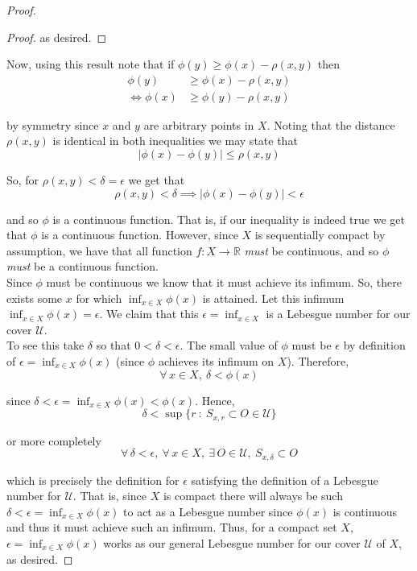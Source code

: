 \documentclass[12pt]{article}
\newlength\tindent
\renewcommand{\indent}{\hspace*{\tindent}}
\newcommand{\R}{\mathbb R}
\begin{document}
\begin{proof}
\begin{proof}
as desired.
\end{proof}

Now, using this result note that if $\phi(y) \geq \phi(x) - \rho(x,y)$ then
\begin{align*}
	\phi(y) &\geq \phi(x) - \rho(x,y) \\
\iff \phi(x) &\geq \phi(y) - \rho(x,y)
\end{align*}

by symmetry since $x$ and $y$ are arbitrary points in $X$. Noting that the distance $\rho(x,y)$ is identical in both inequalities we may state that
\begin{equation*}
	|\phi(x) - \phi(y)| \leq \rho(x,y)
\end{equation*}

So, for $\rho(x,y) < \delta = \epsilon$ we get that
\begin{equation*}
	\rho(x,y) < \delta \implies |\phi(x) - \phi(y)| < \epsilon
\end{equation*}

and so $\phi$ is a continuous function. That is, if our inequality is indeed true we get that $\phi$ is a continuous function. However, since $X$ is sequentially compact by assumption, we have that all function $f:X\to\R$ {\em must} be continuous, and so $\phi$ {\em must} be a continuous function. \\

\indent Since $\phi$ must be continuous we know that it must achieve its infimum. So, there exists some $x$ for which $\inf_{x\in X} \phi(x)$ is attained. Let this infimum $\inf_{x\in X} \phi(x)= \epsilon$. We claim that this $\epsilon = \inf_{x\in X}$ is a Lebesgue number for our cover $\mathcal U$. \\

\indent To see this take $\delta$ so that $0 < \delta < \epsilon$. The small value of $\phi$ must be $\epsilon$ by definition of $\epsilon = \inf_{x\in X} \phi(x)$ (since $\phi$ achieves its infimum on $X$). Therefore,
\begin{equation*}
	\forall\,x\in X,~\delta < \phi(x)
\end{equation*}

since $\delta < \epsilon = \inf_{x\in X} \phi(x) <  \phi(x)$. Hence,
\begin{equation*}
	\delta < \sup \{r ~:~ S_{x,r} \subset O \in \mathcal U\}
\end{equation*}

or more completely
\begin{equation*}
	\forall\,\delta < \epsilon,~\forall\,x\in X,~\exists\,O\in\mathcal U,~S_{x,\delta} \subset O
\end{equation*}

which is precisely the definition for $\epsilon$ satisfying the definition of a Lebesgue number for $\mathcal U$. That is, since $X$ is compact there will always be such $\delta < \epsilon = \inf_{x \in X} \phi(x)$ to act as a Lebesgue number since $\phi(x)$ is continuous and thus it must achieve such an infimum. Thus, for a compact set $X$, $\epsilon = \inf_{x \in X} \phi(x)$ works as our general Lebesgue number for our cover $\mathcal U$ of $X$, as desired.
\end{proof}
\end{document}
